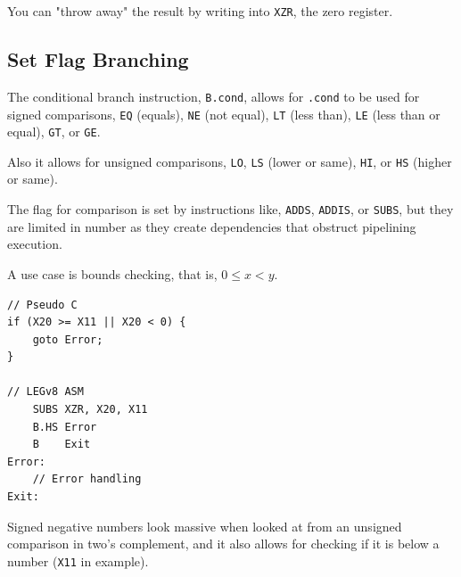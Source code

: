 \documentclass[11pt]{article}
\begin{document}
You can "throw away" the result by writing into \texttt{XZR}, the zero register.

\subsection*{Set Flag Branching}

The conditional branch instruction, \texttt{B.cond}, allows for \texttt{.cond} to be used for signed comparisons, \texttt{EQ} (equals), \texttt{NE} (not equal), \texttt{LT} (less than), \texttt{LE} (less than or equal), \texttt{GT}, or \texttt{GE}.

Also it allows for unsigned comparisons, \texttt{LO}, \texttt{LS} (lower or same), \texttt{HI}, or \texttt{HS} (higher or same).

The flag for comparison is set by instructions like, \texttt{ADDS}, \texttt{ADDIS}, or \texttt{SUBS}, but they are limited in number as they create dependencies that obstruct pipelining execution.

A use case is bounds checking, that is, $0\le x < y$.
\pagebreak

\begin{lstlisting}[caption={Bounds checking shortcut in LEGv8 ASM}]
// Pseudo C
if (X20 >= X11 || X20 < 0) {
    goto Error;
}

// LEGv8 ASM
    SUBS XZR, X20, X11
    B.HS Error
    B    Exit
Error:
    // Error handling
Exit:
\end{lstlisting}

Signed negative numbers look massive when looked at from an unsigned comparison in two's complement, and it also allows for checking if it is below a number (\texttt{X11} in example).










%
%
%
%
%
%
%
%
\end{document}
